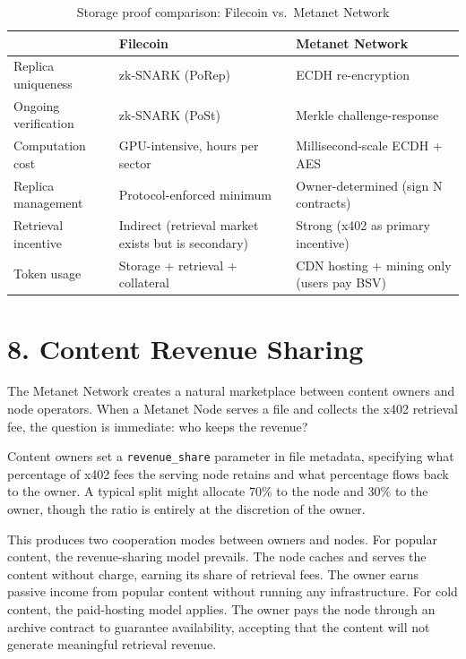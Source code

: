 \documentclass[11pt,a4paper]{article}
\begin{document}
\begin{table}[htbp]
\centering
\small
\begin{tabularx}{\textwidth}{@{}l >{\raggedright\arraybackslash}X >{\raggedright\arraybackslash}X@{}}
\toprule
 & \textbf{Filecoin} & \textbf{Metanet Network} \\
\midrule
Replica uniqueness & zk-SNARK (PoRep) & ECDH re-encryption \\
Ongoing verification & zk-SNARK (PoSt) & Merkle challenge-response \\
Computation cost & GPU-intensive, hours per sector & Millisecond-scale ECDH + AES \\
Replica management & Protocol-enforced minimum & Owner-determined (sign N contracts) \\
Retrieval incentive & Indirect (retrieval market exists but is secondary) & Strong (x402 as primary incentive) \\
Token usage & Storage + retrieval + collateral & CDN hosting + mining only (users pay BSV) \\
\bottomrule
\end{tabularx}
\caption{Storage proof comparison: Filecoin vs.\ Metanet Network}
\end{table}

\section{8. Content Revenue Sharing}

The Metanet Network creates a natural marketplace between content owners and node operators. When a Metanet Node serves a file and collects the x402 retrieval fee, the question is immediate: who keeps the revenue?

Content owners set a \texttt{revenue\_share} parameter in file metadata, specifying what percentage of x402 fees the serving node retains and what percentage flows back to the owner. A typical split might allocate 70\% to the node and 30\% to the owner, though the ratio is entirely at the discretion of the owner.

This produces two cooperation modes between owners and nodes. For popular content, the revenue-sharing model prevails. The node caches and serves the content without charge, earning its share of retrieval fees. The owner earns passive income from popular content without running any infrastructure. For cold content, the paid-hosting model applies. The owner pays the node through an archive contract to guarantee availability, accepting that the content will not generate meaningful retrieval revenue.
\end{document}
